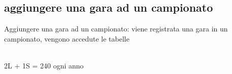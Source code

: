 \documentclass[a4paper,12pt]{report}
\begin{document}
	\subsection{aggiungere una gara ad un campionato}
	Aggiungere una gara ad un campionato:
	viene registrata una gara in un campionato, vengono accedute le tabelle
	\begin{table}[!htb]
		\centering
		\begin{center}
		\newline\\
		2L + 1S = 240 ogni anno\\
		\end{center}
	\end{table}\\
\end{document}
